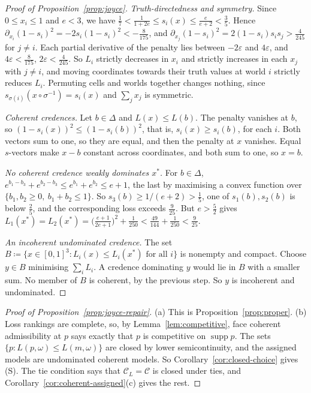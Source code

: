 \documentclass[11pt]{article}
\theoremstyle{definition}
\theoremstyle{remark}
\newcommand{\C}{\mathcal C}
\newcommand{\supp}{\operatorname{supp}}
\begin{document}
\begin{proof}[Proof of Proposition~\ref{prop:joyce}]
\emph{Truth-directedness and symmetry.} Since $0\le x_i\le1$ and $e<3$, we have $\frac17<\frac1{1+2e}\le s_i(x)\le\frac e{e+2}<\frac35$. Hence $\partial_{x_i}(1-s_i)^2=-2s_i(1-s_i)^2<-\frac8{175}$, and $\partial_{x_j}(1-s_i)^2=2(1-s_i)s_is_j>\frac4{245}$ for $j\ne i$. Each partial derivative of the penalty lies between $-2\varepsilon$ and $4\varepsilon$, and $4\varepsilon<\frac8{175}$, $2\varepsilon<\frac4{245}$. So $L_i$ strictly decreases in $x_i$ and strictly increases in each $x_j$ with $j\ne i$, and moving coordinates towards their truth values at world $i$ strictly reduces $L_i$. Permuting cells and worlds together changes nothing, since $s_{\sigma(i)}(x\circ\sigma^{-1})=s_i(x)$ and $\sum_jx_j$ is symmetric.

\emph{Coherent credences.} Let $b\in\Delta$ and $L(x)\le L(b)$. The penalty vanishes at $b$, so $(1-s_i(x))^2\le(1-s_i(b))^2$, that is, $s_i(x)\ge s_i(b)$, for each $i$. Both vectors sum to one, so they are equal, and then the penalty at $x$ vanishes. Equal $s$-vectors make $x-b$ constant across coordinates, and both sum to one, so $x=b$.

\emph{No coherent credence weakly dominates $x^*$.} For $b\in\Delta$, $e^{b_1-b_3}+e^{b_2-b_3}\le e^{b_1}+e^{b_2}\le e+1$, the last by maximising a convex function over $\{b_1,b_2\ge0,\ b_1+b_2\le1\}$. So $s_3(b)\ge1/(e+2)>\frac15$, one of $s_1(b),s_2(b)$ is below $\frac25$, and the corresponding loss exceeds $\frac9{25}$. But $e>\frac52$ gives $L_1(x^*)=L_2(x^*)=\bigl(\frac{e+1}{2e+1}\bigr)^2+\frac1{250}<\frac{49}{144}+\frac1{250}<\frac9{25}$.

\emph{An incoherent undominated credence.} The set $B\coloneqq\{x\in[0,1]^3:L_i(x)\le L_i(x^*)\text{ for all }i\}$ is nonempty and compact. Choose $y\in B$ minimising $\sum_iL_i$. A credence dominating $y$ would lie in $B$ with a smaller sum. No member of $B$ is coherent, by the previous step. So $y$ is incoherent and undominated.
\end{proof}

\begin{proof}[Proof of Proposition~\ref{prop:joyce-repair}]
(a) This is Proposition~\ref{prop:proper}. (b) Loss rankings are complete, so, by Lemma~\ref{lem:competitive}, face coherent admissibility at $p$ says exactly that $p$ is competitive on $\supp p$. The sets $\{p:L(p,\omega)\le L(m,\omega)\}$ are closed by lower semicontinuity, and the assigned models are undominated coherent models. So Corollary~\ref{cor:closed-choice} gives (S). The tie condition says that $\C_L=\C$ is closed under ties, and Corollary~\ref{cor:coherent-assigned}(c) gives the rest.
\end{proof}
\end{document}
